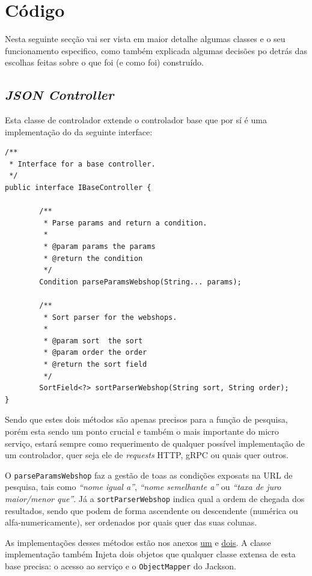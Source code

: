 \newpage

\section{Código}

Nesta seguinte secção vai ser vista em maior detalhe algumas classes e o seu funcionamento especifico, como também explicada algumas decisões po detrás das escolhas feitas sobre o que foi (e como foi) construído.

\subsection{\textit{JSON Controller}}

Esta classe de controlador extende o controlador base que por sí é uma implementação do da seguinte interface:

\begin{verbatim}
/**
 * Interface for a base controller.
 */
public interface IBaseController {
        
        /**
         * Parse params and return a condition.
         *
         * @param params the params
         * @return the condition
         */
        Condition parseParamsWebshop(String... params);
        
        /**
         * Sort parser for the webshops.
         *
         * @param sort  the sort
         * @param order the order
         * @return the sort field
         */
        SortField<?> sortParserWebshop(String sort, String order);
}
\end{verbatim}

Sendo que estes dois métodos são apenas precisos para a função de pesquisa, porém esta sendo um ponto crucial e também o mais importante do micro serviço, estará sempre como requerimento de qualquer possível implementação de um controlador, quer seja ele de \textit{requests} HTTP, gRPC ou quais quer outros.

O \texttt{parseParamsWebshop} faz a gestão de toas as condições exposats na URL de pesquisa, tais como \textit{``nome igual a''}, \textit{``nome semelhante a''} ou \textit{``taxa de juro maior/menor que''}. Já a \texttt{sortParserWebshop} indica qual a ordem de chegada dos resultados, sendo que podem de forma ascendente ou descendente (numérica ou alfa-numericamente), ser ordenados por quais quer das suas colunas.

As implementações desses métodos estão nos anexos \hyperref[an1]{um} e \hyperref[an2]{dois}. A classe implementação também Injeta dois objetos que qualquer classe extensa de esta base precisa: o acesso ao serviço e o \texttt{ObjectMapper} do Jackson.

